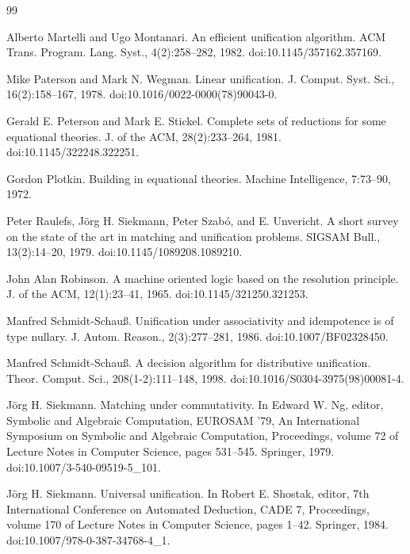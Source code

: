\documentclass[10pt,a4paper]{amsart}
\begin{document}
\begin{thebibliography}{99}
\par\noindent  [42]  Alberto Martelli and Ugo Montanari.  An efficient unification algorithm.  ACM Trans. Program. Lang. Syst., 4(2):258–282, 1982.  doi:10.1145/357162.357169.  
 
\par\noindent  [43]  Mike Paterson and Mark N. Wegman.  Linear unification.  J. Comput. Syst. Sci., 16(2):158–167, 1978.  doi:10.1016/0022-0000(78)90043-0.  
 
\par\noindent  [44]  Gerald E. Peterson and Mark E. Stickel.  Complete sets of reductions for some equational theories.  J. of the ACM, 28(2):233–264, 1981.  doi:10.1145/322248.322251.  
 
\par\noindent  [45]  Gordon Plotkin.  Building in equational theories.  Machine Intelligence, 7:73–90, 1972.  
 
\par\noindent  [46]  Peter Raulefs, Jörg H. Siekmann, Peter Szabó, and E. Unvericht.  A short survey on the state of the art in matching and unification problems.  SIGSAM Bull., 13(2):14–20, 1979.  doi:10.1145/1089208.1089210.  
 
\par\noindent  [47]  John Alan Robinson.  A machine oriented logic based on the resolution principle.  J. of the ACM, 12(1):23–41, 1965.  doi:10.1145/321250.321253.  
 
\par\noindent  [48]  Manfred Schmidt-Schauß.  Unification under associativity and idempotence is of type nullary.  J. Autom. Reason., 2(3):277–281, 1986.  doi:10.1007/BF02328450.  
 
\par\noindent  [49]  Manfred Schmidt-Schauß.  A decision algorithm for distributive unification.  Theor. Comput. Sci., 208(1-2):111–148, 1998.  doi:10.1016/S0304-3975(98)00081-4.  
 
\par\noindent  [50]  Jörg H. Siekmann.  Matching under commutativity.  In Edward W. Ng, editor, Symbolic and Algebraic Computation, EUROSAM ’79, An International Symposium on Symbolic and Algebraic Computation, Proceedings, volume 72 of Lecture Notes in Computer Science, pages 531–545. Springer, 1979.  doi:10.1007/3-540-09519-5\_101.  
 
\par\noindent  [51]  Jörg H. Siekmann.  Universal unification.  In Robert E. Shostak, editor, 7th International Conference on Automated Deduction, CADE 7, Proceedings, volume 170 of Lecture Notes in Computer Science, pages 1–42. Springer, 1984.  doi:10.1007/978-0-387-34768-4\_1.  
 

\end{thebibliography}
\end{document}
